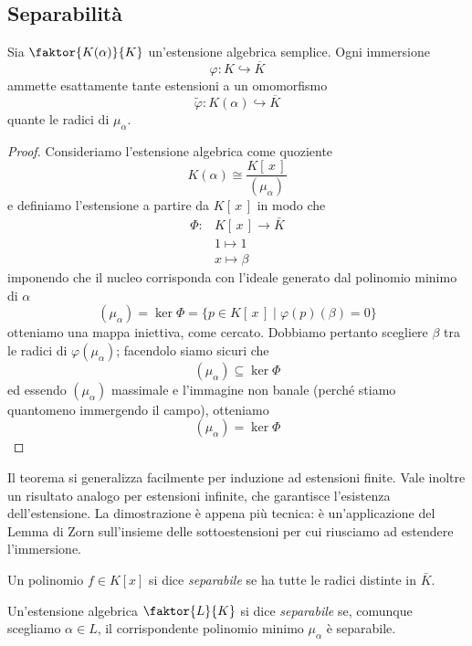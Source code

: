 \subsection{Separabilità}
\begin{multicols}{2}
	
	\begin{theorem}[di immersione]\label{est}
		Sia $ \faktor{K(\alpha)}{K} $ un'estensione algebrica semplice. Ogni immersione
		\[ \varphi: K \hookrightarrow \overline{K} \]
		ammette esattamente tante estensioni a un omomorfismo
		\[ \tilde{\varphi}: K(\alpha) \hookrightarrow \overline{K} \]
		 quante le radici di $ \mu_\alpha $.
	\end{theorem}
	\begin{proof}
		Consideriamo l'estensione algebrica come quoziente
		\[ K(\alpha) \cong \frac{K[\, x \,]}{(\mu_\alpha)} \]
		e definiamo l'estensione a partire da $ K[\, x \,] $ in modo che
		\begin{align*}
		\Phi\colon &K[\, x \,] \to \bar{K} \\
		& 1 \mapsto 1 \\
		& x \mapsto \beta 
		\end{align*}
		imponendo che il nucleo corrisponda con l'ideale generato dal polinomio minimo di $ \alpha $
		\[ (\mu_\alpha) = \ker{\Phi} = \{ p \in K[\, x \,] \mid \varphi(p)(\beta) = 0 \} \]
		otteniamo una mappa iniettiva, come cercato.
		Dobbiamo pertanto scegliere $ \beta $ tra le radici di $ \varphi(\mu_\alpha) $; facendolo siamo sicuri che
		\[ (\mu_\alpha) \subseteq \ker{\Phi} \]
		ed essendo $ (\mu_\alpha) $ massimale e l'immagine non banale (perché stiamo quantomeno immergendo il campo), otteniamo
		\[ (\mu_\alpha) = \ker{\Phi} \]
	\end{proof}
	\begin{remark}
		Il teorema si generalizza facilmente per induzione ad estensioni finite. Vale inoltre un risultato analogo per estensioni infinite, che garantisce l'esistenza dell'estensione. La dimostrazione è appena più tecnica: è un'applicazione del Lemma di Zorn sull'insieme delle sottoestensioni per cui riusciamo ad estendere l'immersione. 
	\end{remark}


	\begin{definition}[Separabile]
		Un polinomio $ f \in K[x] $ si dice \emph{separabile} se ha tutte le radici distinte in $ \bar{K} $.
		
		Un'estensione algebrica $ \faktor{L}{K} $ si dice \emph{separabile} se, comunque scegliamo $\alpha \in L  $, il corrispondente polinomio minimo $ \mu_\alpha $ è separabile.
	\end{definition}


\end{multicols}
